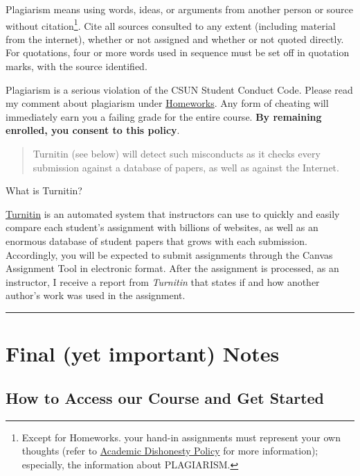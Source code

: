\documentclass[11pt,]{article}
\begin{document}
Plagiarism means using words, ideas, or arguments from another person or
source without citation\footnote{Except for Homeworks. your hand-in
  assignments must represent your own thoughts (refer to
  \protect\hyperlink{dishonesty}{Academic Dishonesty Policy} for more
  information); especially, the information about PLAGIARISM.}. Cite all
sources consulted to any extent (including material from the internet),
whether or not assigned and whether or not quoted directly. For
quotations, four or more words used in sequence must be set off in
quotation marks, with the source identified.

Plagiarism is a serious violation of the CSUN Student Conduct Code.
Please read my comment about plagiarism under
\protect\hyperlink{homeworks}{Homeworks}. Any form of cheating will
immediately earn you a failing grade for the entire course. \textbf{By
remaining enrolled, you consent to this policy}.

\begin{quote}
Turnitin (see below) will detect such misconducts as it checks every
submission against a database of papers, as well as against the
Internet.
\end{quote}

What is Turnitin?

\href{https://www.turnitin.com/}{Turnitin} is an automated system that
instructors can use to quickly and easily compare each student's
assignment with billions of websites, as well as an enormous database of
student papers that grows with each submission. Accordingly, you will be
expected to submit assignments through the Canvas Assignment Tool in
electronic format. After the assignment is processed, as an instructor,
I receive a report from \emph{Turnitin} that states if and how another
author's work was used in the assignment.

\begin{center}\rule{0.5\linewidth}{0.5pt}\end{center}

\hypertarget{final-yet-important-notes}{%
\section{Final (yet important) Notes}\label{final-yet-important-notes}}

\hypertarget{how-to-access-our-course-and-get-started}{%
\subsection{How to Access our Course and Get
Started}\label{how-to-access-our-course-and-get-started}}
\end{document}
